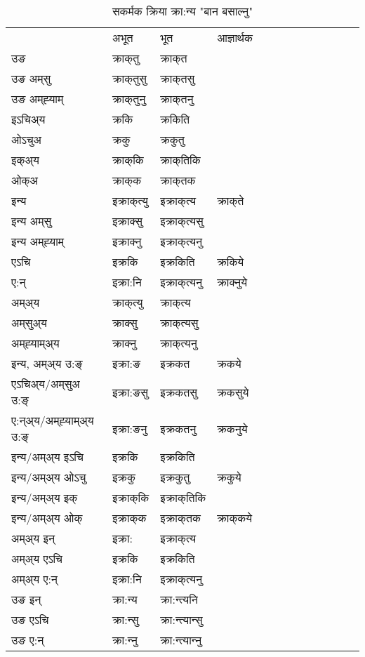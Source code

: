 \begin{table}[H]
\centering
\caption{\label{akt.vt} सकर्मक क्रिया  क्रा:न्य  "बान बसाल्नु"  }
\begin{tabular}{l|l|l|l|l|l|l|l|l|l|l|l|l}  \toprule
&अभूत & भूत & आज्ञार्थक \\ 
उङ &क्राक्‌तु &क्राक्‌त \\ 
उङ अम्‌सु&क्राक्‌तुसु &क्राक्‌तसु \\ 
उङ अम्‌ह्‍याम्&क्राक्‌तुनु &क्राक्‌तनु \\ 
इऽचिअ्य &क्रकि &क्रकिति   \\ 
ओऽचुअ        &क्रकु &क्रकुतु   \\ 
इक्अ्य&क्राक्‌कि &क्राक्‌तिकि   \\ 
ओक्अ &क्राक्‌क &क्राक्‌तक   \\ 
इन्य & इक्राक्‌त्यु  & इक्राक्‌त्य &क्राक्‌ते  \\ 
इन्य अम्‌सु& इक्राक्सु  & इक्राक्‌त्यसु   \\ 
इन्य अम्‌ह्‍याम्& इक्राक्‍नु  & इक्राक्‌त्यनु   \\ 
एऽचि & इक्रकि & इक्रकिति &क्रकिये    \\ 
ए:न् & इक्रा:नि  & इक्राक्‌त्यनु &क्राक्‍नुये  \\ 
अम्अ्य & क्राक्‌त्यु  & क्राक्‌त्य  \\ 
अम्‌सुअ्य & क्राक्सु & क्राक्‌त्यसु  \\ 
अम्‌ह्‍याम्अ्य & क्राक्‍नु  & क्राक्‌त्यनु \\ 
\midrule
इन्य, अम्अ्य उ:ङ्‌ &इक्रा:ङ &इक्रकत &क्रकये \\ 
एऽचिअ्य/अम्‌सुअ उ:ङ्‌ &इक्रा:ङसु &इक्रकतसु &क्रकसुये \\ 
ए:न्अ्य/अम्‌ह्‍याम्अ्य उ:ङ्‌ &इक्रा:ङनु &इक्रकतनु &क्रकनुये \\ 
इन्य/अम्अ्य इऽचि &इक्रकि &इक्रकिति    \\ 
इन्य/अम्अ्य ओऽचु &इक्रकु &इक्रकुतु  &क्रकुये  \\ 
इन्य/अम्अ्य इक् &इक्राक्‌कि &इक्राक्‌तिकि   \\ 
इन्य/अम्अ्य ओक् &इक्राक्‌क &इक्राक्‌तक  &क्राक्‌कये  \\ 
अम्अ्य इन् & इक्रा: & इक्राक्‌त्य   \\ 
अम्अ्य एऽचि & इक्रकि & इक्रकिति    \\ 
अम्अ्य ए:न् & इक्रा:नि  & इक्राक्‌त्यनु  \\ 
\midrule
उङ इन् & क्रा:न्य  & क्रा:न्त्यनि  \\ 
उङ एऽचि & क्रा:न्सु  & क्रा:न्त्यान्सु   \\ 
उङ ए:न्& क्रा:न्‍नु  & क्रा:न्त्यान्‍नु   \\ 
\bottomrule
\end{tabular}
\end{table}


